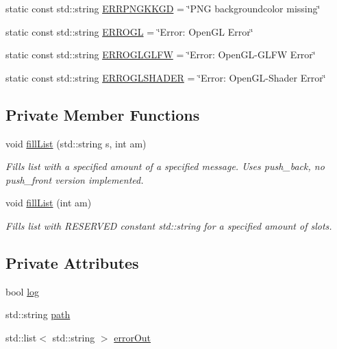 \begin{DoxyCompactItemize}
\item 
static const std\+::string \mbox{\hyperlink{classErrorHandler_ad9b65ee3a71ddf4ef50a83035236a41b}{E\+R\+R\+P\+N\+G\+K\+K\+GD}} = \char`\"{}P\+NG backgroundcolor missing\char`\"{}
\item 
static const std\+::string \mbox{\hyperlink{classErrorHandler_ae3d9cd71ebd01927c4528c2d8bbc5229}{E\+R\+R\+O\+GL}} = \char`\"{}Error\+: Open\+GL Error\char`\"{}
\item 
static const std\+::string \mbox{\hyperlink{classErrorHandler_a6af88062525b88dbc5679665c07a95ce}{E\+R\+R\+O\+G\+L\+G\+L\+FW}} = \char`\"{}Error\+: Open\+GL-\/G\+L\+FW Error\char`\"{}
\item 
static const std\+::string \mbox{\hyperlink{classErrorHandler_a0b89fe8a09e799097bf2ac29e92b32a8}{E\+R\+R\+O\+G\+L\+S\+H\+A\+D\+ER}} = \char`\"{}Error\+: Open\+GL-\/Shader Error\char`\"{}
\end{DoxyCompactItemize}
\subsection*{Private Member Functions}
\begin{DoxyCompactItemize}
\item 
void \mbox{\hyperlink{classErrorHandler_a3036b8ff4299ac0505b6b2ca6fab11a1}{fill\+List}} (std\+::string s, int am)
\begin{DoxyCompactList}\small\item\em Fills list with a specified amount of a specified message. Uses push\+\_\+back, no push\+\_\+front version implemented. \end{DoxyCompactList}\item 
void \mbox{\hyperlink{classErrorHandler_a4edd505cdb0ae60da6f9e26b0fb90f68}{fill\+List}} (int am)
\begin{DoxyCompactList}\small\item\em Fills list with R\+E\+S\+E\+R\+V\+ED constant std\+::string for a specified amount of slots. \end{DoxyCompactList}\end{DoxyCompactItemize}
\subsection*{Private Attributes}
\begin{DoxyCompactItemize}
\item 
bool \mbox{\hyperlink{classErrorHandler_ad1dc2ca6c4b226730361cc8d7b786e30}{log}}
\item 
std\+::string \mbox{\hyperlink{classErrorHandler_aeabbc987b7eaa01b6d006b55b4e00574}{path}}
\item 
std\+::list$<$ std\+::string $>$ \mbox{\hyperlink{classErrorHandler_aeb3bff116fcb83a58defbef8e8111f0e}{error\+Out}}
\end{DoxyCompactItemize}



